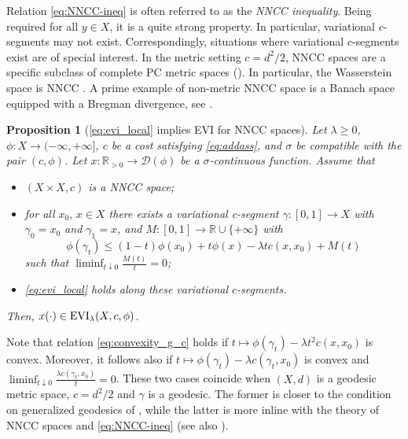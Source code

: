\documentclass[reqno]{amsart}
\newcounter{results}[section]
\theoremstyle{plain}
\newtheorem{proposition}[results]{Proposition}
\theoremstyle{remark}
\theoremstyle{plain}
\numberwithin{equation}{section}
\theoremstyle{remark}
\newcommand{\R}{\mathbb{R}}
\newcommand{\YY}{X}
\newcommand{\dom}[1]{\mathscr{D}(#1)}
\DeclareMathOperator{\EVI}{{\rm EVI}}
\begin{document}
 Relation  \eqref{eq:NNCC-ineq} is  often referred to as the  \emph{NNCC inequality}.  Being required for all $y \in \YY$, it is a quite strong property. In particular, variational $c$-segments may not exist.  
 Correspondingly, situations where variational $c$-segments exist are of  special  
 interest. In the metric setting $c={d^2}/{2}$, NNCC spaces are a   specific  subclass  of complete PC metric spaces (\cite[Proposition 2.26]{leger2024nonnegative}).  In particular,  the Wasserstein space is NNCC \cite[Theorem 3.11]{leger2024nonnegative}. A prime example of non-metric NNCC space is a Banach space equipped with a Bregman divergence, see \cite[Example 2.9]{leger2024nonnegative}.

\begin{proposition}[\eqref{eq:evi_local} implies EVI for NNCC spaces] \label{prop:evi_local_2}    Let $\lambda \ge 0$, $\phi:X\to (-\infty, + \infty]$, $c$ be a cost satisfying \eqref{eq:addass}, and $\sigma$ be compatible with the pair $(c,\phi)$.  
Let $x: \R_{>0}  \to \dom{\phi}$ be a $\sigma$-continuous function. Assume that 
\begin{itemize}
    \item[\rm i)] $(X\times X,c)$ is  a  NNCC space; 
    \item[\rm ii)] for all $x_0,\, x \in X$ 
    there exists a variational c-segment $\gamma:[0,1]\to X$  with  $\gamma_{ 0 }=x_0$ and $\gamma_{ 1}=x$, and 
     $M:[0,1]\to \R \cup \{+\infty\}$ with 
    \begin{equation}\label{eq:convexity_g_c}
        \phi(\gamma_t) \le (1-t)\phi(x_0)+t\phi(x)-\lambda t c(x,x_0)+ M(t) 
    \end{equation}
     such that   $\liminf_{t\downarrow 0}\frac{M(t)}{t}=0$; 
    \item[\rm iii)] \eqref{eq:evi_local} holds along these  variational  $c$-segments.
    \end{itemize}
    Then, $x(\cdot)  \in  \EVI_\lambda(X,c,\phi)$. 
\end{proposition}
 Note that relation  \eqref{eq:convexity_g_c} holds if 
$t\mapsto \phi(\gamma_t) - \lambda t^2 c(x,x_0)$  is convex. Moreover, it follows also if $t\mapsto \phi(\gamma_t) - \lambda c(\gamma_t,x_0)$ is convex and  $\liminf_{t\downarrow 0} \frac{\lambda c(\gamma_t,x_0)}{t}=0$. 
These two  cases  coincide when $(X,d)$ is a geodesic metric space, $c=d^2/2$ and $\gamma$ is a geodesic. The  former  is closer to the  condition on  generalized geodesics of \cite{ags08}, while the  latter  is more inline with  the theory of  NNCC spaces and \eqref{eq:NNCC-ineq} (see also ).
\end{document}
